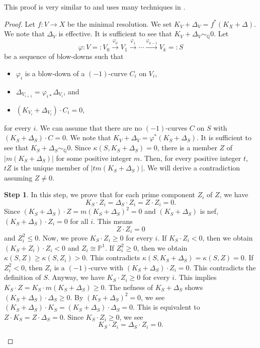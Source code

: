 \documentclass[12pt,twoside]{amsart}
\theoremstyle{definition}
\newtheorem{step}{Step}
\begin{document}
This proof is very similar to \cite[Theorem~6.1]{Fujino} and 
uses many techniques in \cite[section~5]{Fujita}.

\begin{proof}
\setcounter{step}{0}
Let $f:V\to X$ be the minimal resolution. 
We set $K_V+\Delta_V=f^*(K_X+\Delta)$. 
We note that $\Delta_V$ is effective. 
It is sufficient to see that $K_V+\Delta_V\sim _{\mathbb Q}0$. 
Let 
$$
\varphi:V=:V_0\overset{\varphi_0}\to V_1\overset{\varphi_1}\to \cdots 
\overset{\varphi_{k-1}}\to V_k=:S 
$$ 
be a sequence of blow-downs such that 
\begin{itemize}
\item[(1)] $\varphi_i$ is a blow-down of a $(-1)$-curve $C_i$ on $V_i$, 
\item[(2)] $\Delta_{V_{i+1}}=\varphi_{i*}\Delta_{V_i}$, and 
\item[(3)] $(K_{V_i}+\Delta_{V_i})\cdot C_i=0$, 
\end{itemize}
for every $i$. 
We can assume that there are no $(-1)$-curves $C$ on $S$ with 
$(K_S+\Delta_S)\cdot C=0$. We note that 
$K_V+\Delta_V=\varphi^*(K_S+\Delta_S)$. 
It is sufficient to 
see that $K_S+\Delta_S\sim _{\mathbb Q}0$. 
Since $\kappa(S, K_S+\Delta_S)=0$, there is a member $Z$ of 
$|m(K_S+\Delta_S)|$ for some positive integer $m$. 
Then, for every positive integer $t$, 
$tZ$ is the unique member of $|tm(K_S+\Delta_S)|$. 
We will derive a contradiction assuming $Z\ne 0$. 

\begin{step}
In this step, we prove that for each prime component $Z_i$ of $Z$, 
we have 
$$K_S\cdot Z_i=\Delta_S \cdot Z_i=Z\cdot Z_i=0. $$
Since $(K_S+\Delta_S)\cdot Z=m(K_S+\Delta_S)^2=0$ 
and $(K_S+\Delta_S)$ is nef, 
$(K_S+\Delta_S)\cdot Z_i=0$ for all $i$. 
This means $$Z\cdot Z_i=0$$ and $Z_i^2 \leq 0$. 
Now, we prove $K_S\cdot Z_i \geq 0$ for every $i$. 
If $K_S\cdot Z_i < 0$, then we obtain 
$(K_S+Z_i)\cdot Z_i<0$ and $Z_i \cong \mathbb{P}^1$. 
If $Z_i^2 \geq 0$, then we obtain
$\kappa(S, Z) \geq \kappa (S, Z_i)>0.$ 
This contradicts 
$\kappa(S, K_S+\Delta_S)=\kappa(S, Z)=0.$ 
If $Z_i^2 < 0$, then $Z_i$ is a $(-1)$-curve 
with $(K_S+\Delta_S)\cdot Z_i=0.$ 
This contradicts the definition of $S$. 
Anyway, we have $K_S\cdot Z_i \geq 0$ for every $i$.
This implies $K_S\cdot Z=K_S\cdot m(K_S+\Delta_S) \geq 0.$ 
The nefness of $K_S+\Delta_S$ shows $(K_S+\Delta_S)\cdot \Delta_S \geq 0.$ 
By $(K_S+\Delta_S)^2=0$, we see 
$(K_S+\Delta_S)\cdot K_S=(K_S+\Delta_S)\cdot \Delta_S=0.$ 
This is equivalent to $Z\cdot K_S=Z\cdot \Delta_S=0.$ 
Since $K_S\cdot Z_i \geq 0$, we see 
$$K_S\cdot Z_i=\Delta_S \cdot Z_i=0. $$
\end{step}


\end{proof}
\end{document}
